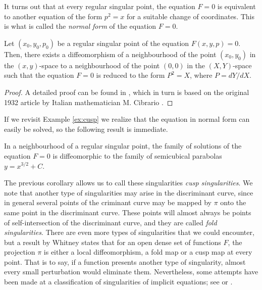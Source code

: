 It turns out that at every regular singular point, the equation $F=0$ is equivalent to another equation of the form $p^2=x$ for a suitable change of coordinates. This is what is called the \textit{normal form} of the equation $F=0$.

\begin{theorem} Let $(x_0,y_0,p_0)$ be a regular singular point of the equation $F(x,y,p)=0$. Then, there exists a diffeomorphism of a neighbourhood of the point $(x_0,y_0)$ in the $(x,y)$-space to a neighbourhood of the point $(0,0)$ in the $(X,Y)$-space such that the equation $F=0$ is reduced to the form $P^2=X$, where $P=dY/dX$.

\end{theorem}

\begin{proof}
  A detailed proof can be found in \cite[27]{arnold2012geometrical}, which in turn is based on the original 1932 article by Italian mathematician M. Cibrario \cite{cibrario1932reduzione}.
\end{proof}
If we revisit Example \ref{ex:cusp} we realize that the equation in normal form can easily be solved, so the following result is immediate.

\begin{corollary} In a neighbourhood of a regular singular point, the family of solutions of the equation $F=0$ is diffeomorphic to the family of semicubical parabolas $y=x^{3/2}+C$.

\end{corollary}

The previous corollary allows us to call these singularities \textit{cusp singularities}. We note that another type of singularities may arise in the discriminant curve, since in general several points of the criminant curve may be mapped by $\pi$ onto the same point in the discriminant curve. These points will almost always be points of self-intersection of the discriminant curve, and they are called \textit{fold singularities}. There are even more types of singularities that we could encounter, but a result by Whitney \cite{whitney1955singularities} states that for an open dense set of functions $F$, the projection $\pi$ is either a local diffeomorphism, a fold map or a cusp map at every point. That is to say, if a function presents another type of singularity, almost every small perturbation would eliminate them. Nevertheless, some attempts have been made at a classification of singularities of implicit equations; see \cite{chertovskih2014pleated} or \cite{dara1975singularites}.

